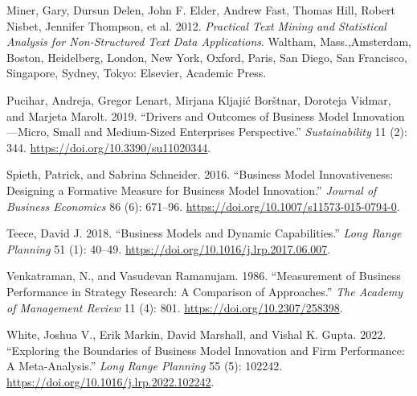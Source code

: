 \documentclass[
]{article}
\newlength{\cslhangindent}
\newenvironment{CSLReferences}[2] %
 {\begin{list}{}{%
  \setlength{\itemindent}{0pt}
  \setlength{\leftmargin}{0pt}
  \setlength{\parsep}{0pt}
  \ifodd #1
   \setlength{\leftmargin}{\cslhangindent}
   \setlength{\itemindent}{-1\cslhangindent}
  \fi
  \setlength{\itemsep}{#2\baselineskip}}}
 {\end{list}}
\begin{document}
\begin{CSLReferences}{1}{0}
Miner, Gary, Dursun Delen, John F. Elder, Andrew Fast, Thomas Hill,
Robert Nisbet, Jennifer Thompson, et al. 2012. \emph{Practical Text
Mining and Statistical Analysis for Non-Structured Text Data
Applications}. Waltham, Mass.,Amsterdam, Boston, Heidelberg, London, New
York, Oxford, Paris, San Diego, San Francisco, Singapore, Sydney, Tokyo:
Elsevier, Academic Press.

Pucihar, Andreja, Gregor Lenart, Mirjana Kljajić Borštnar, Doroteja
Vidmar, and Marjeta Marolt. 2019. {``Drivers and {Outcomes} of
{Business} {Model} {Innovation}---{Micro}, {Small} and {Medium}-{Sized}
{Enterprises} {Perspective}.''} \emph{Sustainability} 11 (2): 344.
\url{https://doi.org/10.3390/su11020344}.

Spieth, Patrick, and Sabrina Schneider. 2016. {``Business Model
Innovativeness: Designing a Formative Measure for Business Model
Innovation.''} \emph{Journal of Business Economics} 86 (6): 671--96.
\url{https://doi.org/10.1007/s11573-015-0794-0}.

Teece, David J. 2018. {``Business Models and Dynamic Capabilities.''}
\emph{Long Range Planning} 51 (1): 40--49.
\url{https://doi.org/10.1016/j.lrp.2017.06.007}.

Venkatraman, N., and Vasudevan Ramanujam. 1986. {``Measurement of
{Business} {Performance} in {Strategy} {Research}: {A} {Comparison} of
{Approaches}.''} \emph{The Academy of Management Review} 11 (4): 801.
\url{https://doi.org/10.2307/258398}.

White, Joshua V., Erik Markin, David Marshall, and Vishal K. Gupta.
2022. {``Exploring the Boundaries of Business Model Innovation and Firm
Performance: {A} Meta-Analysis.''} \emph{Long Range Planning} 55 (5):
102242. \url{https://doi.org/10.1016/j.lrp.2022.102242}.

\end{CSLReferences}
\end{document}
